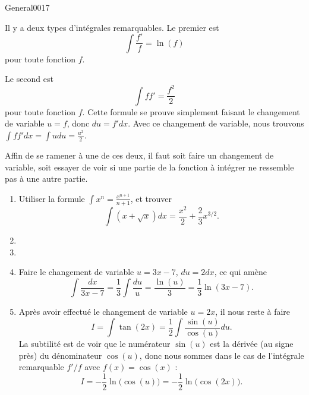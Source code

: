 \begin{corrige}{General0017}

Il y a deux types d'intégrales remarquables. Le premier est
\begin{equation}
	\int\frac{ f' }{ f }=\ln(f)
\end{equation}
pour toute fonction $f$.

Le second est
\begin{equation}
	\int ff'=\frac{ f^2 }{2}
\end{equation}
pour toute fonction $f$. Cette formule se prouve simplement faisant le changement de variable $u=f$, donc $du=f'dx$. Avec ce changement de variable, nous trouvons $\int ff'dx=\int udu=\frac{ u^2 }{2}$.

Affin de se ramener à une de ces deux, il faut soit faire un changement de variable, soit essayer de voir si une partie de la fonction à intégrer ne ressemble pas à une autre partie.

\renewcommand{\theenumi}{\arabic{enumi}}
\begin{enumerate}

\item
Utiliser la formule $\int x^n=\frac{ x^{n+1} }{ n+1 }$, et trouver
\begin{equation}
	\int(x+\sqrt{x})dx=\frac{ x^2 }{ 2 }+\frac{ 2 }{ 3 }x^{3/2}.
\end{equation}

\item
\item

\item
Faire le changement de variable $u=3x-7$, $du=2dx$, ce qui amène
\begin{equation}
	\int \frac{dx}{ 3x-7 }=\frac{1}{ 3 }\int \frac{ du }{ u }=\frac{ \ln(u) }{ 3 }=\frac{1}{ 3 }\ln(3x-7).
\end{equation}

\item\label{ItemIntCinq}
Après avoir effectué le changement de variable $u=2x$, il nous reste à faire
\begin{equation}
	I=\int\tan(2x)=\frac{1}{ 2 }\int\frac{ \sin(u) }{ \cos(u) }du.
\end{equation}
La subtilité est de voir que le numérateur $\sin(u)$ est la dérivée (au signe près) du dénominateur $\cos(u)$, donc nous sommes dans le cas de l'intégrale remarquable $f'/f$ avec $f(x)=\cos(x)$ :
\begin{equation}
	I=-\frac{ 1 }{2}\ln\big( \cos(u) \big)=-\frac{ 1 }{2}\ln\big( \cos(2x) \big).
\end{equation}


\end{enumerate}
\end{corrige}
